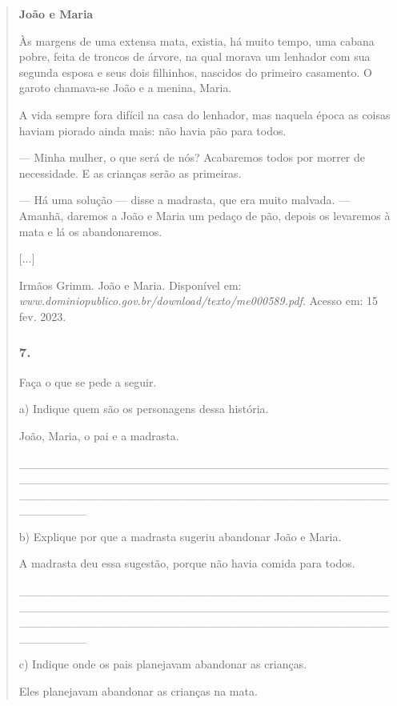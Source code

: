\begin{quote}
\textbf{João e Maria}

Às margens de uma extensa mata, existia, há muito tempo, uma cabana
pobre, feita de troncos de árvore, na qual morava um lenhador com sua segunda esposa e
seus dois filhinhos, nascidos do primeiro casamento. O garoto chamava-se João e a
menina, Maria.

A vida sempre fora difícil na casa do lenhador, mas naquela época as
coisas haviam piorado ainda mais: não havia pão para todos.

--- Minha mulher, o que será de nós? Acabaremos todos por morrer
de necessidade. E as crianças serão as primeiras.

--- Há uma solução --- disse a madrasta, que era muito
malvada. --- Amanhã, daremos a João e Maria um pedaço de pão, depois os
levaremos à mata e lá os abandonaremos.

{[}...{]}

Irmãos Grimm. João e Maria. Disponível em:
\emph{www.dominiopublico.gov.br/download/texto/me000589.pdf}. Acesso em: 15
fev. 2023.

\subsubsection{7. }\label{section-22} Faça o que se pede a seguir.

a) Indique quem são os personagens dessa história.

João, Maria, o pai e a madrasta.

\_\_\_\_\_\_\_\_\_\_\_\_\_\_\_\_\_\_\_\_\_\_\_\_\_\_\_\_\_\_\_\_\_\_\_\_\_\_\_\_\_\_\_\_\_\_\_\_\_\_\_\_\_\_\_\_\_\_\_\_\_\_\_\_\_\_\_\_\_\_\_\_\_\_\_\_\_\_\_\_\_\_\_\_\_\_\_\_\_\_\_\_\_\_\_\_\_\_\_\_\_\_\_\_\_\_\_\_\_\_\_\_\_\_\_\_\_\_\_\_\_\_\_\_\_\_\_\_\_\_\_\_\_\_\_\_\_\_\_\_

b) Explique por que a madrasta sugeriu abandonar João e Maria.

A madrasta deu essa sugestão, porque não havia comida para todos.

\_\_\_\_\_\_\_\_\_\_\_\_\_\_\_\_\_\_\_\_\_\_\_\_\_\_\_\_\_\_\_\_\_\_\_\_\_\_\_\_\_\_\_\_\_\_\_\_\_\_\_\_\_\_\_\_\_\_\_\_\_\_\_\_\_\_\_\_\_\_\_\_\_\_\_\_\_\_\_\_\_\_\_\_\_\_\_\_\_\_\_\_\_\_\_\_\_\_\_\_\_\_\_\_\_\_\_\_\_\_\_\_\_\_\_\_\_\_\_\_\_\_\_\_\_\_\_\_\_\_\_\_\_\_\_\_\_\_\_\_

c) Indique onde os pais planejavam abandonar as crianças.

Eles planejavam abandonar as crianças na mata.


\end{quote}
